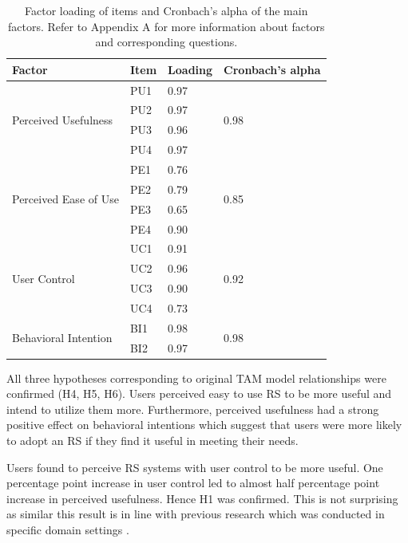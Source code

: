\documentclass[a4paper,12pt]{article}
\begin{document}
\begin{table}[ht]
\centering
\begin{tabular}{llll}
\hline
\textbf{Factor}             & \textbf{Item} & \textbf{Loading} & \textbf{Cronbach's alpha} \\ \hline
\multirow{4}{*}{Perceived Usefulness} & PU1   & 0.97 & \multirow{4}{*}{0.98}  \\
                             & PU2   & 0.97  \\
                             & PU3   & 0.96  \\
                             & PU4   & 0.97   \\ \hline
\multirow{4}{*}{Perceived Ease of Use} & PE1   & 0.76 & \multirow{4}{*}{0.85} \\
                             & PE2   & 0.79  \\
                             & PE3   & 0.65  \\
                             & PE4   & 0.90  \\ \hline
\multirow{4}{*}{User Control} & UC1   & 0.91  & \multirow{4}{*}{0.92} \\
                             & UC2   & 0.96  \\
                             & UC3   & 0.90  \\
                             & UC4   & 0.73  \\ \hline
\multirow{2}{*}{Behavioral Intention} & BI1   & 0.98  & \multirow{2}{*}{0.98} \\
                             & BI2   & 0.97  \\ \hline
\end{tabular}
\caption{Factor loading of items and Cronbach's alpha of the main factors. Refer to Appendix A for more information about factors and corresponding questions.}
\label{tab:factorloadings}
\end{table}

All three hypotheses corresponding to original TAM model relationships were confirmed (H4, H5, H6). Users perceived easy to use RS to be more useful and intend to utilize them more.  Furthermore, perceived usefulness had a strong positive effect on behavioral intentions which suggest that users were more likely to adopt an RS if they find it useful in meeting their needs.

Users found to perceive RS systems with user control to be more useful. One percentage point increase in user control led to almost half percentage point increase in perceived usefulness. Hence H1 was confirmed. This is not surprising as similar this result is in line with previous research which was conducted in specific domain settings \citep{bostandjiev2012tasteweights, millecampControllingSpotifyRecommendations2018}. 
\end{document}

